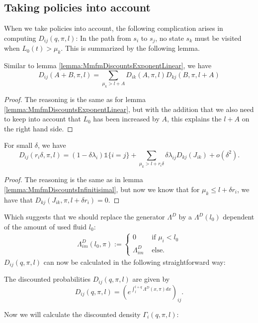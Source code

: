 \subsection{Taking policies into account}
When we take policies into account, the following complication arises in computing $D_{ij}(q, \pi,l)$:
In the path from $s_i$ to $s_j$, no state $s_k$ must be visited when $L_0(t)>\mu_k$.
This is summarized by the following lemma.
\begin{lemma}
	Similar to lemma \ref{lemma:MmfmDiscountsExponentLinear}, we have
	\[
	D_{ij}(A+B,\pi,l)=\sum\limits_{\mu_k>l+A} D_{ik}(A,\pi,l)D_{kj}(B,\pi,l+A)
	\]
	\begin{proof}
		The reasoning is the same as for lemma \ref{lemma:MmfmDiscountsExponentLinear}, but with the addition that we also need to keep into account that $L_0$ has been increased by $A$, this explains the $l+A$ on the right hand side.
	\end{proof}
\end{lemma}

\begin{lemma}
	For small $\delta$, we have
	\[
	D_{ij}(r_i\delta,\pi,l)=(1-\delta\lambda_i)\mathds{1}\{i=j\}+\sum\limits_{\mu_k>l+r_i\delta}\delta\lambda_{ij}D_{kj}(J_{ik})+o(\delta^2).
	\]
	\begin{proof}
		The reasoning is the same as in lemma \ref{lemma:MmfmDiscountsInfinitisimal}, but now we know that for $\mu_k\leq l+\delta r_i$, we have that $D_{kj}(J_{ik},\pi,l+\delta r_i)=0$.
	\end{proof}
\end{lemma}
Which suggests that we should replace the generator $\Lambda^D$ by a $\Lambda^D(l_0)$ dependent of the amount of used fluid $l_0$:
\begin{equation}
\begin{split}
\Lambda^D_{im}(l_0,\pi):=\begin{cases}
0&\text{ if }\mu_i<l_0\\
\Lambda^D_{im}&\text{ else.}
\end{cases}
\end{split}
\end{equation}
$D_{ij}(q, \pi,l)$ can now be calculated in the following straightforward way:
\begin{theorem}
	The discounted probabilities $D_{ij}(q, \pi,l)$ are given by
	\[
	D_{ij}(q, \pi,l)=\left(e^{\int_l^{l+q}\Lambda^D(x,\pi)dx}\right)_{ij}.
	\]
\end{theorem}
Now we will calculate the discounted density $\Gamma_i(q,\pi,l)$:

